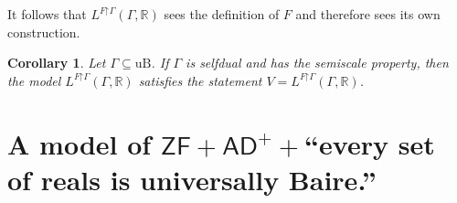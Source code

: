 \documentclass[fleqn, 11pt]{amsart}
\theoremstyle{plain}
\newtheorem{cor}[thm]{Corollary} \newtheorem*{cor*}{Corollary}
\theoremstyle{definition}
\theoremstyle{remark}
\newcommand{\Ord}{\mathrm{Ord}}
\newcommand{\HOD}{\mathrm{HOD}}
\newcommand{\uB}{\mathrm{uB}}
\newcommand{\restrict}{\mathord{\restriction}}
\begin{document}




It follows that $L^{F \restrict \Gamma}(\Gamma, \mathbb{R})$ sees the definition of $F$ and therefore sees its own construction.


\begin{cor}\label{Mabscor}
 Let $\Gamma \subseteq \uB$.  If $\Gamma$ is selfdual and has the semiscale property, then
 the model $L^{F \restrict \Gamma}(\Gamma, \mathbb{R})$ satisfies the statement $V = L^{F \restrict \Gamma}(\Gamma, \mathbb{R})$.
\end{cor}




\section{A model of $\mathsf{ZF} + \mathsf{AD}^+ + {}$``every set of reals is universally Baire.''}\label{amodelsec}
\end{document}
